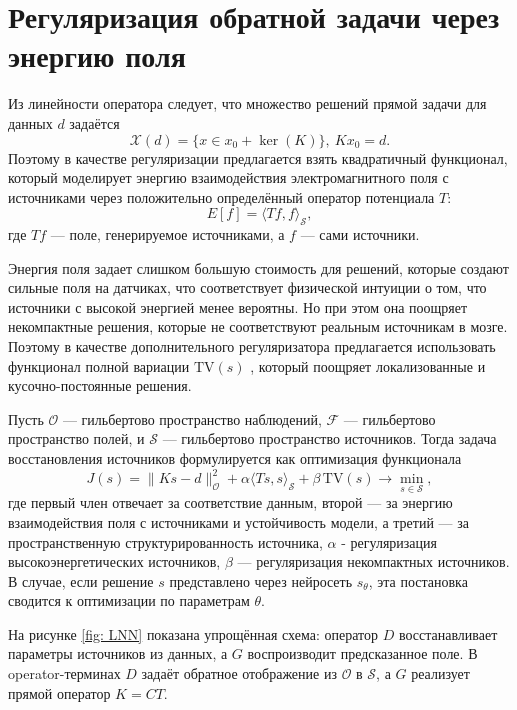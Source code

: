 \documentclass[a4paper,14pt,oneside,openany]{extarticle}
\begin{document}
\newpage
\section{Регуляризация обратной задачи через энергию поля}

Из линейности оператора следует, что множество решений прямой задачи для данных $d$ задаётся 
$$\mathcal{X}(d)=\{x \in x_0 + \ker(K)\},~Kx_0=d.$$
Поэтому в качестве регуляризации предлагается взять квадратичный функционал, который моделирует энергию взаимодействия электромагнитного поля с источниками через положительно определённый оператор потенциала $T$:
\begin{equation}
    E[f] = \langle T f, f \rangle_{\mathcal{S}},
\end{equation}
где $Tf$ — поле, генерируемое источниками, а $f$ — сами источники.

Энергия поля задает слишком большую стоимость для решений, которые создают сильные поля на датчиках, что соответствует 
физической интуиции о том, что источники с высокой энергией менее вероятны. Но при этом она поощряет некомпактные решения,
которые не соответствуют реальным источникам в мозге. 
Поэтому в качестве дополнительного регуляризатора предлагается использовать функционал полной вариации $\mathrm{TV}(s)$ \cite{Mokhtari2023}, 
который поощряет локализованные и кусочно-постоянные решения.

Пусть $\mathcal{O}$ — гильбертово пространство наблюдений, $\mathcal{F}$ — гильбертово пространство полей, 
и $\mathcal{S}$ — гильбертово пространство источников.  Тогда задача восстановления источников формулируется 
как оптимизация функционала
\begin{equation}\label{eq:general_functional_full}
    J(s) = \|K s - d\|_{\mathcal{O}}^2 + \alpha \langle T s, s \rangle_{\mathcal{S}} + 
    \beta\,\mathrm{TV}(s) \rightarrow \min_{s\in\mathcal{S}},
\end{equation}
где первый член отвечает за соответствие данным, второй — за энергию взаимодействия поля с источниками и устойчивость модели,
а третий — за пространственную структурированность источника, $\alpha$ - регуляризация высокоэнергетических источников,
$\beta$ — регуляризация некомпактных источников. В случае, если решение $s$ представлено через нейросеть $s_\theta$,
эта постановка сводится к оптимизации по параметрам $\theta$.

На рисунке \ref{fig: LNN} показана упрощённая схема: оператор $D$ восстанавливает параметры источников из данных, 
а $G$ воспроизводит предсказанное поле. В operator-терминах $D$ задаёт обратное отображение из $\mathcal{O}$ в $\mathcal{S}$,
а $G$ реализует прямой оператор $K = C T$.
\end{document}
